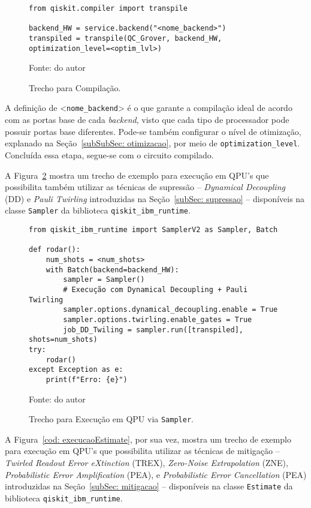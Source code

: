 \begin{figure}[!htb]
\centering
\caption{Trecho para Compilação.} 
\begin{verbatim}
from qiskit.compiler import transpile

backend_HW = service.backend("<nome_backend>")
transpiled = transpile(QC_Grover, backend_HW, optimization_level=<optim_lvl>)
\end{verbatim}
{\small Fonte: do autor} 
\label{cod: compilacao} 
\end{figure}

A definição de <\texttt{nome\_backend}> é o que garante a compilação ideal de acordo com as portas base de cada \textit{backend}, visto que cada tipo de processador pode possuir portas base diferentes. Pode-se também configurar o nível de otimização, explanado na Seção~\ref{subSubSec: otimizacao}, por meio de \texttt{optimization\_level}. Concluída essa etapa, segue-se com o circuito compilado.

A Figura~\ref{cod: execucaoSampler} mostra um trecho de exemplo para execução em QPU's que possibilita também utilizar as técnicas de supressão -- \textit{Dynamical Decoupling} (DD) e \textit{Pauli Twirling} introduzidas na Seção~\ref{subSec: supressao} -- disponíveis na classe \texttt{Sampler} da biblioteca \texttt{qiskit\_ibm\_runtime}.

\begin{figure}[!htb]
\centering
\caption{Trecho para Execução em QPU via \texttt{Sampler}.} 
\begin{verbatim}
from qiskit_ibm_runtime import SamplerV2 as Sampler, Batch

def rodar():
    num_shots = <num_shots>
    with Batch(backend=backend_HW):
        sampler = Sampler()
        # Execução com Dynamical Decoupling + Pauli Twirling
        sampler.options.dynamical_decoupling.enable = True
        sampler.options.twirling.enable_gates = True
        job_DD_Twiling = sampler.run([transpiled], shots=num_shots)
try:
    rodar()
except Exception as e:
    print(f"Erro: {e}")
\end{verbatim}
{\small Fonte: do autor} 
\label{cod: execucaoSampler} 
\end{figure}

A Figura~\ref{cod: execucaoEstimate}, por sua vez, mostra um trecho de exemplo para execução em QPU's que possibilita utilizar as técnicas de mitigação -- \textit{Twirled Readout Error eXtinction} (TREX), \textit{Zero-Noise Extrapolation} (ZNE), \textit{Probabilistic Error Amplification} (PEA), e \textit{Probabilistic Error Cancellation} (PEA) introduzidas na Seção~\ref{subSec: mitigacao} -- disponíveis na classe \texttt{Estimate} da biblioteca \texttt{qiskit\_ibm\_runtime}.

